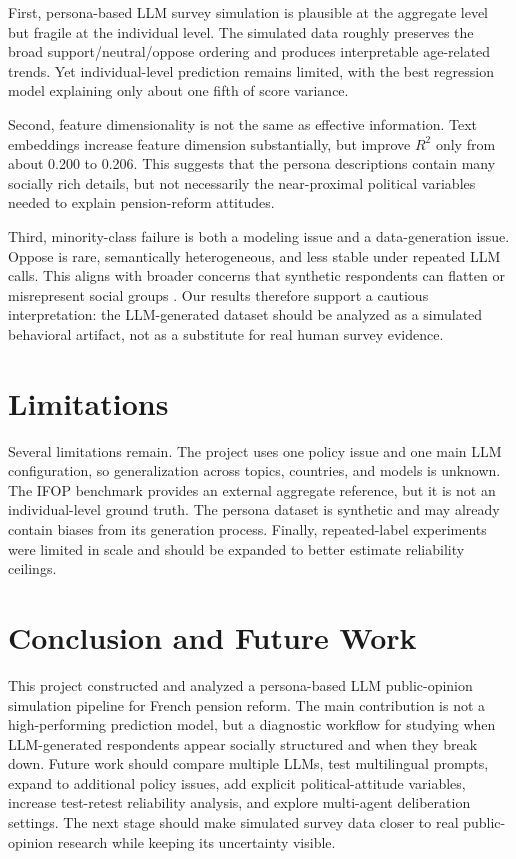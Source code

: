﻿\documentclass[sigconf,nonacm]{acmart}
\begin{document}
First, persona-based LLM survey simulation is plausible at the aggregate level but fragile at the individual level. The simulated data roughly preserves the broad support/neutral/oppose ordering and produces interpretable age-related trends. Yet individual-level prediction remains limited, with the best regression model explaining only about one fifth of score variance.

Second, feature dimensionality is not the same as effective information. Text embeddings increase feature dimension substantially, but improve $R^2$ only from about 0.200 to 0.206. This suggests that the persona descriptions contain many socially rich details, but not necessarily the near-proximal political variables needed to explain pension-reform attitudes.

Third, minority-class failure is both a modeling issue and a data-generation issue. Oppose is rare, semantically heterogeneous, and less stable under repeated LLM calls. This aligns with broader concerns that synthetic respondents can flatten or misrepresent social groups \cite{wang2024replace,cheng2023marked}. Our results therefore support a cautious interpretation: the LLM-generated dataset should be analyzed as a simulated behavioral artifact, not as a substitute for real human survey evidence.

\section{Limitations}
Several limitations remain. The project uses one policy issue and one main LLM configuration, so generalization across topics, countries, and models is unknown. The IFOP benchmark provides an external aggregate reference, but it is not an individual-level ground truth. The persona dataset is synthetic and may already contain biases from its generation process. Finally, repeated-label experiments were limited in scale and should be expanded to better estimate reliability ceilings.

\section{Conclusion and Future Work}
This project constructed and analyzed a persona-based LLM public-opinion simulation pipeline for French pension reform. The main contribution is not a high-performing prediction model, but a diagnostic workflow for studying when LLM-generated respondents appear socially structured and when they break down. Future work should compare multiple LLMs, test multilingual prompts, expand to additional policy issues, add explicit political-attitude variables, increase test-retest reliability analysis, and explore multi-agent deliberation settings. The next stage should make simulated survey data closer to real public-opinion research while keeping its uncertainty visible.
\end{document}
